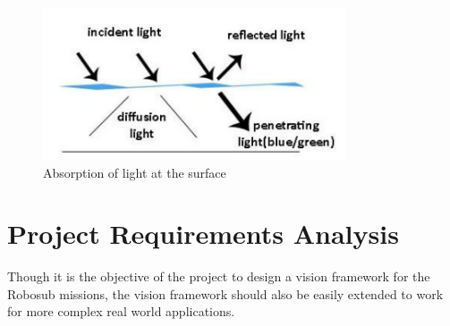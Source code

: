\documentclass[hyp]{socreport}
\begin{document}
\begin{figure}[ht]
\centering

        \includegraphics[width=0.8\textwidth, height=0.2\textheight]{underwater_beerlambert.png}
        \caption{Absorption of light at the surface}
        \label{fig:water_surface_effect}

\end{figure}

\section{Project Requirements Analysis}
Though it is the objective of the project to design a vision framework
for the Robosub missions, the vision framework should also be easily
extended to work for more complex real world applications. 
\end{document}
